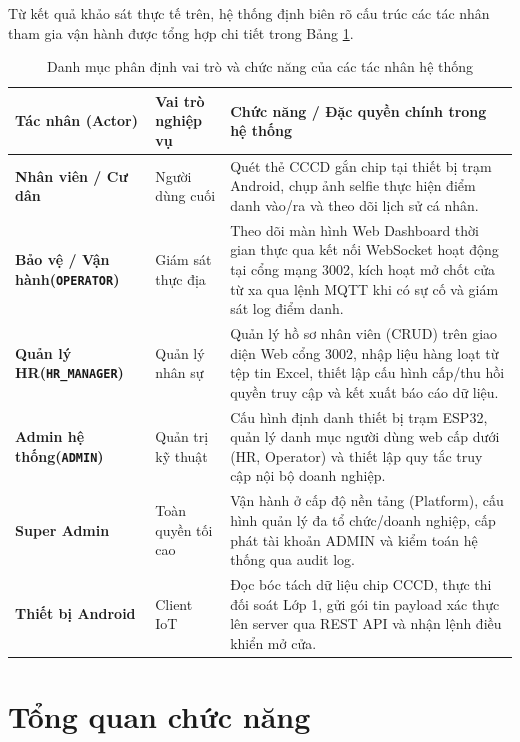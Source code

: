 ﻿\documentclass[../DoAn.tex]{subfiles}
\begin{document}
Từ kết quả khảo sát thực tế trên, hệ thống định biên rõ cấu trúc các tác nhân tham gia vận hành được tổng hợp chi tiết trong Bảng \ref{table:actors}.

\begin{table}[ht!]
\centering
\small
\renewcommand{\arraystretch}{1.3}
\begin{tabular}{|>{\raggedright\arraybackslash}p{2.6cm}|>{\raggedright\arraybackslash}p{2.3cm}|>{\raggedright\arraybackslash}p{8.5cm}|}
\hline
\textbf{Tác nhân (Actor)} & \textbf{Vai trò nghiệp vụ} & \textbf{Chức năng / Đặc quyền chính trong hệ thống} \\
\hline
\textbf{Nhân viên / Cư dân} & Người dùng cuối & Quét thẻ CCCD gắn chip tại thiết bị trạm Android, chụp ảnh selfie thực hiện điểm danh vào/ra và theo dõi lịch sử cá nhân. \\
\hline
\textbf{Bảo vệ / Vận hành\newline(\texttt{OPERATOR})} & Giám sát thực địa & Theo dõi màn hình Web Dashboard thời gian thực qua kết nối WebSocket hoạt động tại cổng mạng 3002, kích hoạt mở chốt cửa từ xa qua lệnh MQTT khi có sự cố và giám sát log điểm danh. \\
\hline
\textbf{Quản lý HR\newline(\texttt{HR\_MANAGER})} & Quản lý nhân sự & Quản lý hồ sơ nhân viên (CRUD) trên giao diện Web cổng 3002, nhập liệu hàng loạt từ tệp tin Excel, thiết lập cấu hình cấp/thu hồi quyền truy cập và kết xuất báo cáo dữ liệu. \\
\hline
\textbf{Admin hệ thống\newline(\texttt{ADMIN})} & Quản trị kỹ thuật & Cấu hình định danh thiết bị trạm ESP32, quản lý danh mục người dùng web cấp dưới (HR, Operator) và thiết lập quy tắc truy cập nội bộ doanh nghiệp. \\
\hline
\textbf{Super Admin} & Toàn quyền tối cao & Vận hành ở cấp độ nền tảng (Platform), cấu hình quản lý đa tổ chức/doanh nghiệp, cấp phát tài khoản ADMIN và kiểm toán hệ thống qua audit log. \\
\hline
\textbf{Thiết bị Android} & Client IoT & Đọc bóc tách dữ liệu chip CCCD, thực thi đối soát Lớp 1, gửi gói tin payload xác thực lên server qua REST API và nhận lệnh điều khiển mở cửa. \\
\hline
\end{tabular}
\caption{Danh mục phân định vai trò và chức năng của các tác nhân hệ thống}
\label{table:actors}
\end{table}

\section{Tổng quan chức năng}
\label{section:2.2}
\end{document}
